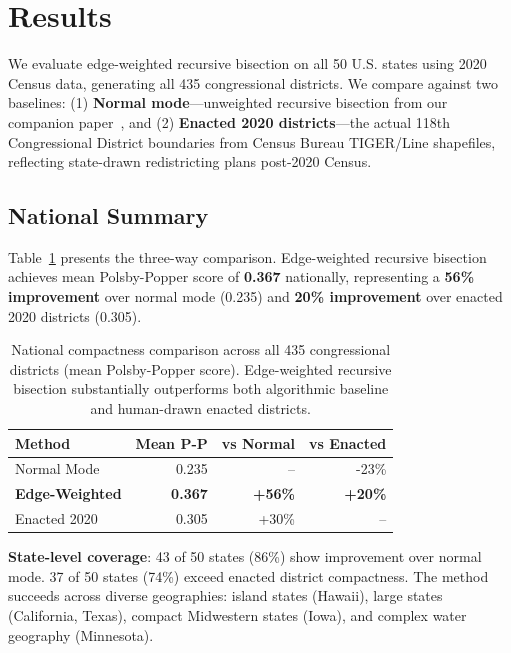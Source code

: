 \section{Results}

We evaluate edge-weighted recursive bisection on all 50 U.S. states using 2020 Census data, generating all 435 congressional districts. We compare against two baselines: (1) \textbf{Normal mode}—unweighted recursive bisection from our companion paper~\cite{TODO-recursive-bisection}, and (2) \textbf{Enacted 2020 districts}—the actual 118th Congressional District boundaries from Census Bureau TIGER/Line shapefiles, reflecting state-drawn redistricting plans post-2020 Census.

\subsection{National Summary}

Table~\ref{tab:national-summary} presents the three-way comparison. Edge-weighted recursive bisection achieves mean Polsby-Popper score of \textbf{0.367} nationally, representing a \textbf{56\% improvement} over normal mode (0.235) and \textbf{20\% improvement} over enacted 2020 districts (0.305).

\begin{table}[h]
\centering
\begin{tabular}{lrrr}
\toprule
\textbf{Method} & \textbf{Mean P-P} & \textbf{vs Normal} & \textbf{vs Enacted} \\
\midrule
Normal Mode & 0.235 & -- & -23\% \\
\textbf{Edge-Weighted} & \textbf{0.367} & \textbf{+56\%} & \textbf{+20\%} \\
Enacted 2020 & 0.305 & +30\% & -- \\
\bottomrule
\end{tabular}
\caption{National compactness comparison across all 435 congressional districts (mean Polsby-Popper score). Edge-weighted recursive bisection substantially outperforms both algorithmic baseline and human-drawn enacted districts.}
\label{tab:national-summary}
\end{table}

\textbf{State-level coverage}: 43 of 50 states (86\%) show improvement over normal mode. 37 of 50 states (74\%) exceed enacted district compactness. The method succeeds across diverse geographies: island states (Hawaii), large states (California, Texas), compact Midwestern states (Iowa), and complex water geography (Minnesota).

